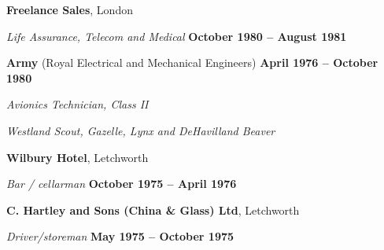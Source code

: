 \documentclass[10pt]{article}
\newenvironment{outerlist}[1][\enskip\textbullet]%
        {\begin{itemize}[#1]}{\end{itemize}%
         \vspace{-.6\baselineskip}}
\newenvironment{innerlist}[1][\enskip\textbullet]%
        {\begin{compactitem}[#1]}{\end{compactitem}}
\begin{document}
\textbf{Freelance Sales}, London
\begin{innerlist}
\item[] \textit{Life Assurance, Telecom and Medical}%
        \hfill \textbf{October 1980 -- August 1981}
\end{innerlist}

\textbf{Army} (Royal Electrical and Mechanical Engineers)
        \hfill \textbf{April 1976 -- October 1980}
\begin{innerlist}
\item[] \textit{Avionics Technician, Class II}
\item[] \textit{Westland Scout, Gazelle, Lynx and DeHavilland Beaver}
\end{innerlist}
%
%
%

\textbf{Wilbury Hotel}, Letchworth%
\begin{innerlist}
\item[] \textit{Bar / cellarman}%
        \hfill \textbf{October 1975 -- April 1976}
%
%
\end{innerlist}


\textbf{C. Hartley and Sons (China \& Glass) Ltd}, Letchworth%
\begin{innerlist}
\item[] \textit{Driver/storeman}%
        \hfill \textbf{May 1975 -- October 1975}
%
%
\end{innerlist}
\end{document}

